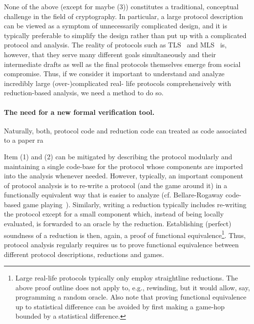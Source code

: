 None of the above (except for maybe (3)) constitutes a traditional, conceptual challenge in the field of cryptography. In particular, a large protocol description can be viewed as a symptom of unnecessarily complicated design, and it is typically preferable to simplify the design rather than put up with a complicated protocol and analysis. The reality of protocols such as TLS~\cite{TLS13} and MLS~\cite{MLS} is, however, that they serve many different goals simultaneously and their intermediate drafts as well as the final protocols themselves emerge from social compromise. 
Thus, if we consider it important to understand and analyze incredibly large (over-)complicated real-
life protocols comprehensively with reduction-based analysis, we need a method to do so.

\paragraph{The need for a new formal verification tool.}

Naturally, both, protocol code and reduction code can treated 
as code associated to a paper ra



Item (1) and (2) can be mitigated by describing the protocol
modularly and maintaining a single code-base for the protocol
whose components are imported into the analysis whenever needed.
However, typically, an important component of protocol analysis 
is to re-write a protocol (and the game around it) in a 
functionally equivalent way that is easier
to analyze (cf. Bellare-Rogaway code-based
game playing~\cite{EC:BelRog06}).
Similarly, writing a reduction typically includes re-writing the protocol 
except for a small component which, instead of being locally evaluated, 
is forwarded to an oracle by the reduction. Establishing (perfect) soundness of 
a reduction is then, again, a proof of functional equivalence\footnote{Large 
real-life protocols typically only employ straightline reductions. The 
above proof outline does not apply to, e.g., rewinding, but it would 
allow, say, programming a random oracle. Also note that proving functional equivalence 
up to statistical difference can be avoided by first making a game-hop
bounded by a statistical difference.}. Thus, protocol analysis regularly
requires us to prove functional equivalence between different protocol descriptions,
reductions and games.

